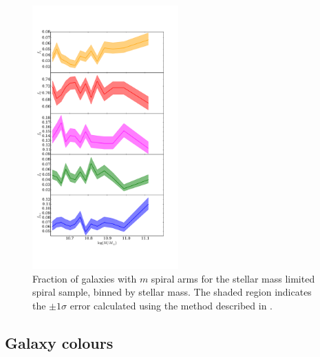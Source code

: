 \documentclass[useAMS,usenatbib]{mn2e}
\begin{document}
\begin{figure}
		\centering
		
        \includegraphics[width=0.5\textwidth]{Data_imgs/mass_plot.pdf}
		
        \caption{Fraction of galaxies with $m$ spiral arms for the stellar mass limited spiral sample, binned by stellar mass. The shaded region indicates the $\pm 1 \sigma$ error calculated using the method described in \protect\cite{Cameron_11}.}
		
        \label{fig:mass_plot}
        
\end{figure}


\subsection{Galaxy colours}
\end{document}
